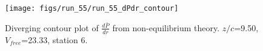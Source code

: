 \begin{figure}[H]
\centering
\texttt{[image: figs/run\_55/run\_55\_dPdr\_contour]}
\caption{Diverging contour plot of $\frac{d\bar{P}}{dr}$ from non-equilibrium theory. $z/c$=9.50, $V_{free}$=23.33, station 6.}
\label{fig:run_55_dPdr_contour}
\end{figure}


